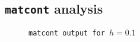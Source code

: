 \newpage
\subsection{\texttt{matcont} analysis}
\begin{figure}


\end{figure}

\begin{figure}


\caption{\texttt{matcont output for $h=0.1$}}
\end{figure}

\begin{figure}

\end{figure}


